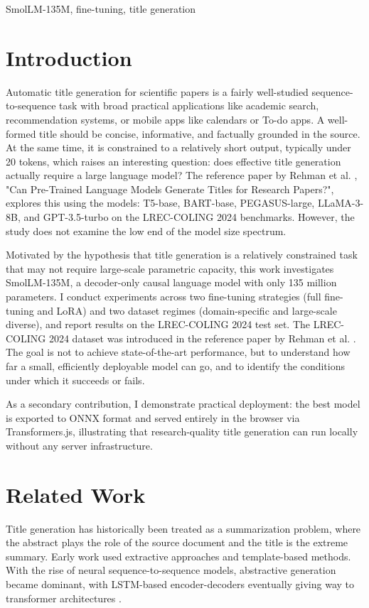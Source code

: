 \documentclass[12pt,conference]{IEEEtran}
\begin{document}
\begin{IEEEkeywords}
SmolLM-135M, fine-tuning, title generation
\end{IEEEkeywords}

\section{Introduction}
Automatic title generation for scientific papers is a fairly well-studied sequence-to-sequence task with broad practical applications like academic search, recommendation systems, or mobile apps like calendars or To-do apps. A well-formed title should be concise, informative, and factually grounded in the source. At the same time, it is constrained to a relatively short output, typically under 20 tokens, which raises an interesting question: does effective title generation actually require a large language model?
The reference paper by Rehman et al. \cite{b2}, "Can Pre-Trained Language Models Generate Titles for Research Papers?", explores this using the models: T5-base, BART-base, PEGASUS-large, LLaMA-3-8B, and GPT-3.5-turbo on the LREC-COLING 2024 benchmarks. However, the study does not examine the low end of the model size spectrum.

Motivated by the hypothesis that title generation is a relatively constrained task that may not require large-scale parametric capacity, this work investigates SmolLM-135M, a decoder-only causal language model with only 135 million parameters. I conduct experiments across two fine-tuning strategies (full fine-tuning and LoRA) and two dataset regimes (domain-specific and large-scale diverse), and report results on the LREC-COLING 2024 test set. The LREC-COLING 2024 dataset was introduced in the reference paper by Rehman et al. \cite{b2}. The goal is not to achieve state-of-the-art performance, but to understand how far a small, efficiently deployable model can go, and to identify the conditions under which it succeeds or fails.

As a secondary contribution, I demonstrate practical deployment: the best model is exported to ONNX format and served entirely in the browser via Transformers.js, illustrating that research-quality title generation can run locally without any server infrastructure.

\section{Related Work}
Title generation has historically been treated as a summarization problem, where the abstract plays the role of the source document and the title is the extreme summary. Early work used extractive approaches and template-based methods. With the rise of neural sequence-to-sequence models, abstractive generation became dominant, with LSTM-based encoder-decoders eventually giving way to transformer architectures \cite{b1}.
\end{document}
